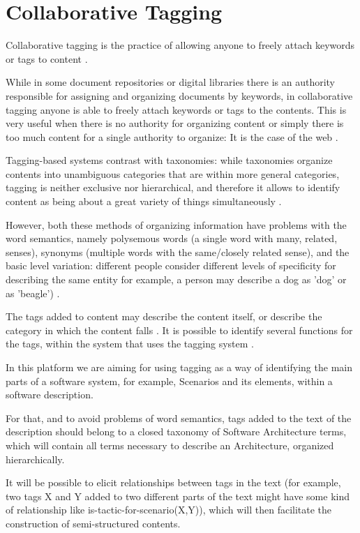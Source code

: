 \section{Collaborative Tagging}
Collaborative tagging is the practice of allowing anyone to freely attach keywords or tags to content \cite{golder2006usage}.

While in some document repositories or digital libraries there is an authority responsible for assigning and organizing documents by keywords, in collaborative tagging anyone is able to freely attach keywords or tags to the contents. This is very useful when there is no authority for organizing content or simply there is too much content for a single authority to organize: It is the case of the web \cite{golder2006usage}.

Tagging-based systems contrast with taxonomies: while taxonomies organize contents into unambiguous categories that are within more general categories, tagging is neither exclusive nor hierarchical, and therefore it allows to identify content as being about a great variety of things simultaneously \cite{golder2006usage}. 

However, both these methods of organizing information have problems with the word semantics, namely polysemous words (a single word with many, related, senses), synonyms (multiple words with the same/closely related sense), and the basic level variation: different people consider different levels of specificity for describing the same entity for example, a person may describe a dog as 'dog' or as 'beagle') \cite{tanaka1991object}. 

The tags added to content may describe the content itself, or describe the category in which the content falls \cite{coates2005two}. It is possible to identify several functions for the tags, within the system that uses the tagging system \cite{golder2006usage}.

In this platform we are aiming for using tagging as a way of identifying the main parts of a software system, for example, Scenarios and its elements, within a software description. 

For that, and to avoid problems of word semantics, tags added to the text of the description should belong to a closed taxonomy of Software Architecture terms, which will contain all terms necessary to describe an Architecture, organized hierarchically. 

It will be possible to elicit relationships between tags in the text (for example, two tags X and Y added to two different parts of the text might have some kind of relationship like is-tactic-for-scenario(X,Y)), which will then facilitate the construction of semi-structured contents.


